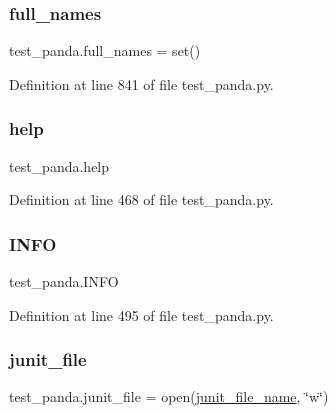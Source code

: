 \subsubsection{\texorpdfstring{full\+\_\+names}{full\_names}}
{\footnotesize\ttfamily test\+\_\+panda.\+full\+\_\+names = set()}



Definition at line 841 of file test\+\_\+panda.\+py.

\mbox{\label{namespacetest__panda_a2a83a208c85465f56398e300d330dfc3}} 
\subsubsection{\texorpdfstring{help}{help}}
{\footnotesize\ttfamily test\+\_\+panda.\+help}



Definition at line 468 of file test\+\_\+panda.\+py.

\mbox{\label{namespacetest__panda_a45eb84e3f3dca7bfa3dfed6fa7d6f3a5}} 
\subsubsection{\texorpdfstring{I\+N\+FO}{INFO}}
{\footnotesize\ttfamily test\+\_\+panda.\+I\+N\+FO}



Definition at line 495 of file test\+\_\+panda.\+py.

\mbox{\label{namespacetest__panda_a5d7e53bce2e246d1521629e4d08898fd}} 
\subsubsection{\texorpdfstring{junit\+\_\+file}{junit\_file}}
{\footnotesize\ttfamily test\+\_\+panda.\+junit\+\_\+file = open(\hyperlink{namespacetest__panda_aa375f80f1bb5f774d7bcfd9d4ded3f5c}{junit\+\_\+file\+\_\+name}, \char`\"{}w\char`\"{})}



